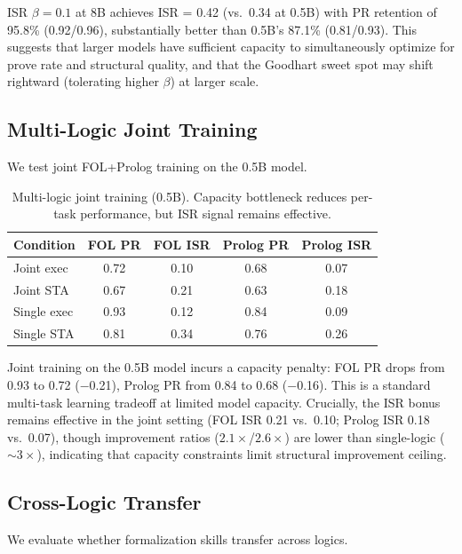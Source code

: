 \documentclass[11pt,twocolumn]{article}
\newcommand{\isr}{\textsc{ISR}}
\newcommand{\pr}{\textsc{PR}}
\begin{document}
ISR $\beta{=}0.1$ at 8B achieves \isr{} = 0.42 (vs.\ 0.34 at 0.5B) with PR retention of 95.8\% (0.92/0.96), substantially better than 0.5B's 87.1\% (0.81/0.93).
This suggests that larger models have sufficient capacity to simultaneously optimize for prove rate and structural quality, and that the Goodhart sweet spot may shift rightward (tolerating higher $\beta$) at larger scale.

\subsection{Multi-Logic Joint Training}

We test joint FOL+Prolog training on the 0.5B model.

\begin{table}[h]
\centering
\caption{Multi-logic joint training (0.5B). Capacity bottleneck reduces per-task performance, but ISR signal remains effective.}
\label{tab:joint}
\small
\begin{tabular}{@{}lcccc@{}}
\toprule
Condition & FOL \pr{} & FOL \isr{} & Prolog \pr{} & Prolog \isr{} \\
\midrule
Joint exec & 0.72 & 0.10 & 0.68 & 0.07 \\
Joint STA & 0.67 & 0.21 & 0.63 & 0.18 \\
Single exec & 0.93 & 0.12 & 0.84 & 0.09 \\
Single STA & 0.81 & 0.34 & 0.76 & 0.26 \\
\bottomrule
\end{tabular}
\end{table}

Joint training on the 0.5B model incurs a capacity penalty: FOL \pr{} drops from 0.93 to 0.72 ($-$0.21), Prolog \pr{} from 0.84 to 0.68 ($-$0.16).
This is a standard multi-task learning tradeoff at limited model capacity.
Crucially, the ISR bonus remains effective in the joint setting (FOL \isr{} 0.21 vs.\ 0.10; Prolog \isr{} 0.18 vs.\ 0.07), though improvement ratios ($2.1\times$/$2.6\times$) are lower than single-logic (${\sim}3\times$), indicating that capacity constraints limit structural improvement ceiling.

\subsection{Cross-Logic Transfer}

We evaluate whether formalization skills transfer across logics.
\end{document}

